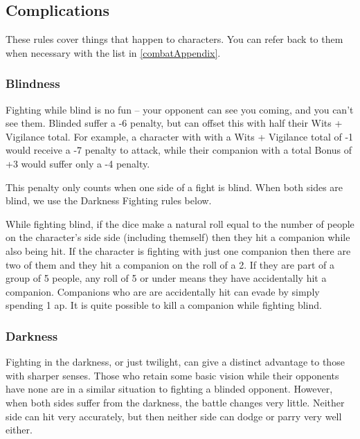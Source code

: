 \begin{multicols}{2}

\subsection{Complications}

These rules cover things that happen to characters.
You can refer back to them when necessary with the list in \autoref{combatAppendix}.

\subsubsection[Blindness: Roll at -6 penalty, + (Wits + Vigilance)/ 2]{Blindness}

Fighting while blind is no fun -- your opponent can see you coming, and you can't see them.
Blinded suffer a -6 penalty, but can offset this with half their Wits + Vigilance total.
For example, a character with with a Wits + Vigilance total of -1 would receive a -7 penalty to attack, while their companion with a total Bonus of +3 would suffer only a -4 penalty.

This penalty only counts when one side of a fight is blind. When both sides are blind, we use the Darkness Fighting rules below.

While fighting blind, if the dice make a \gls{natural} roll equal to the number of people on the character's side side (including themself) then they hit a companion while also being hit.
If the character is fighting with just one companion then there are two of them and they hit a companion on the roll of a 2.
If they are part of a group of 5 people, any roll of 5 or under means they have accidentally hit a companion.
Companions who are are accidentally hit can evade by simply spending 1 \gls{ap}.
It is quite possible to kill a companion while fighting blind.

\subsubsection[Darkness: Penalty equals difference between combatants' Wits + Vigilance]{Darkness}
\label{darkness}

Fighting in the darkness, or just twilight, can give a distinct advantage to those with sharper senses.
Those who retain some basic vision while their opponents have none are in a similar situation to fighting a blinded opponent.
However, when both sides suffer from the darkness, the battle changes very little.
Neither side can hit very accurately, but then neither side can dodge or parry very well either.


\end{multicols}
